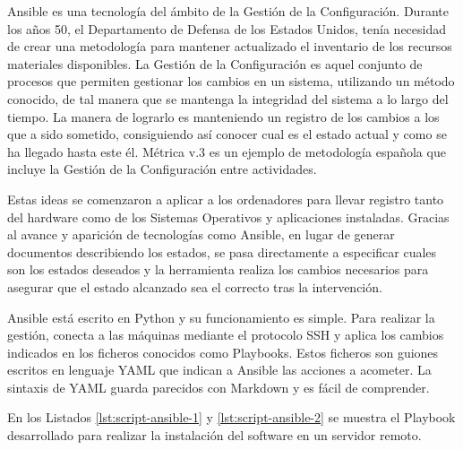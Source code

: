 Ansible es una tecnología del ámbito de la Gestión de la Configuración. Durante los años 50, el Departamento de Defensa de los Estados Unidos, tenía necesidad de crear una metodología para mantener actualizado el inventario de los recursos materiales disponibles. La Gestión de la Configuración es aquel conjunto de procesos que permiten gestionar los cambios en un sistema, utilizando un método conocido, de tal manera que se mantenga la integridad del sistema a lo largo del tiempo. La manera de lograrlo es manteniendo un registro de los cambios a los que a sido sometido, consiguiendo así conocer cual es el estado actual y como se ha llegado hasta este él. Métrica v.3 es un ejemplo de metodología española que incluye la Gestión de la Configuración entre actividades.

Estas ideas se comenzaron a aplicar a los ordenadores para llevar registro tanto del hardware como de los Sistemas Operativos y aplicaciones instaladas. Gracias al avance y aparición de tecnologías como Ansible, en lugar de generar documentos describiendo los estados, se pasa directamente a especificar cuales son los estados deseados y la herramienta realiza los cambios necesarios para asegurar que el estado alcanzado sea el correcto tras la intervención.

Ansible está escrito en Python y su funcionamiento es simple. Para realizar la gestión, conecta a las máquinas mediante el protocolo SSH y aplica los cambios indicados en los ficheros conocidos como Playbooks. Estos ficheros son guiones escritos en lenguaje YAML que indican a Ansible las acciones a acometer. La sintaxis de YAML guarda parecidos con Markdown y es fácil de comprender.

En los Listados \ref{lst:script-ansible-1} y \ref{lst:script-ansible-2} se muestra el Playbook desarrollado para realizar la instalación del software en un servidor remoto.

